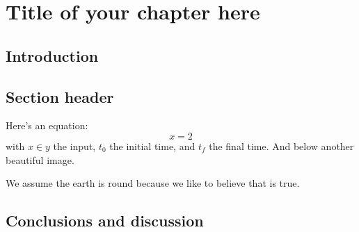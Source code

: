 \chapter[Title of your chapter here]{Title of your chapter here}\label{chap: chapter 3}


\chapterabstract{\lipsum[1]}

\section{Introduction}
\label{sec: chap3 intro}

\lipsum[5-7]


\section{Section header}
\label{sec: chap3 section header}

Here's an equation:
\begin{equation}\label{eq: chap3 vector field} 
x=2
\end{equation}
with $x\in y$ the input, $t_0$ the initial time, and $t_f$ the final time.
And below another beautiful image.

\begin{asm}
We assume the earth is round because we like to believe that is true.
\end{asm}



\section{Conclusions and discussion}
\label{sec: chap3 conclusion}

\lipsum[10-13]
